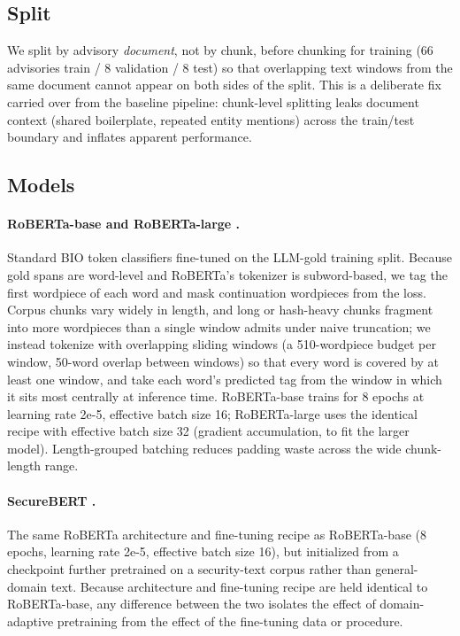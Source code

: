 \documentclass[11pt]{article}
\begin{document}
\subsection{Split}

We split by advisory \emph{document}, not by chunk, before chunking for
training (66 advisories train / 8 validation / 8 test) so that overlapping
text windows from the same document cannot appear on both sides of the
split. This is a deliberate fix carried over from the baseline pipeline:
chunk-level splitting leaks document context (shared boilerplate,
repeated entity mentions) across the train/test boundary and inflates
apparent performance.

\subsection{Models}

\paragraph{RoBERTa-base and RoBERTa-large \citep{liu2019roberta}.} Standard
BIO token classifiers fine-tuned on the LLM-gold training split. Because
gold spans are word-level and RoBERTa's tokenizer is subword-based, we tag
the first wordpiece of each word and mask continuation wordpieces from the
loss. Corpus chunks vary widely in length, and long or hash-heavy chunks
fragment into more wordpieces than a single window admits under naive
truncation; we instead tokenize with overlapping sliding windows (a
510-wordpiece budget per window, 50-word overlap between windows) so that
every word is covered by at least one window, and take each word's predicted
tag from the window in which it sits most centrally at inference time.
RoBERTa-base trains for 8 epochs at learning rate 2e-5, effective batch size
16; RoBERTa-large uses the identical recipe with effective batch size 32
(gradient accumulation, to fit the larger model). Length-grouped batching
reduces padding waste across the wide chunk-length range.

\paragraph{SecureBERT \citep{aghaei2022securebert}.} The same RoBERTa
architecture and fine-tuning recipe as RoBERTa-base (8 epochs, learning rate
2e-5, effective batch size 16), but initialized from a checkpoint further
pretrained on a security-text corpus rather than general-domain text.
Because architecture and fine-tuning recipe are held identical to
RoBERTa-base, any difference between the two isolates the effect of
domain-adaptive pretraining from the effect of the fine-tuning data or
procedure.
\end{document}
